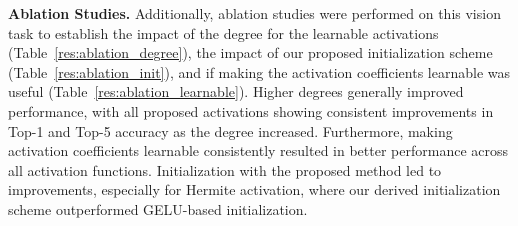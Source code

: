 \documentclass{article} %
\theoremstyle{plain}
\theoremstyle{definition}
\theoremstyle{remark}
\begin{document}
\textbf{Ablation Studies.} Additionally, ablation studies were performed on this vision task to establish the impact of the degree for the learnable activations (Table~\ref{res:ablation_degree}), the impact of our proposed initialization scheme (Table~\ref{res:ablation_init}), and if making the activation coefficients learnable was useful (Table~\ref{res:ablation_learnable}). Higher degrees generally improved performance, with all proposed activations showing consistent improvements in Top-1 and Top-5 accuracy as the degree increased. Furthermore, making activation coefficients learnable consistently resulted in better performance across all activation functions. Initialization with the proposed method led to improvements, especially for Hermite activation, where our derived initialization scheme outperformed GELU-based initialization.

\begin{table}[!htbp]
\caption{Training and validation results of ConvNeXt-T (28M) model on ImageNet-1k classification. Values are reported as mean ± standard deviation over 5 seeds. p-values (two-tailed Student’s t-test assuming equal variances) are for Val Top-1 accuracy compared to GELU.}
\label{res:imagenet}
\begin{center}
\end{center}
\end{table}
\end{document}
